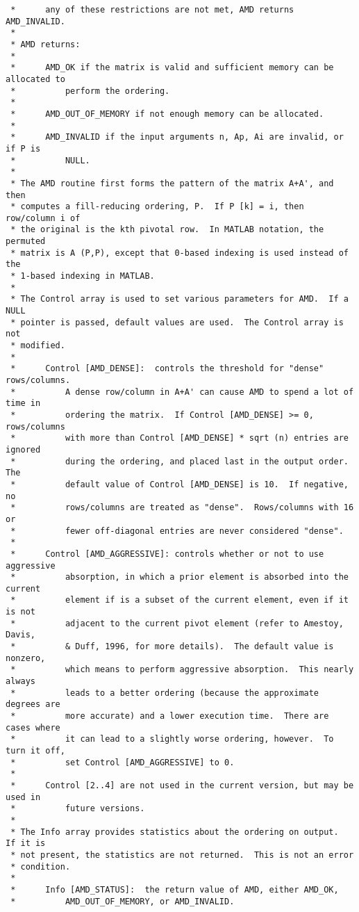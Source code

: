 \documentclass[11pt]{article}
\begin{document}
{\begin{verbatim}
 *      any of these restrictions are not met, AMD returns AMD_INVALID.
 *
 * AMD returns:
 *
 *      AMD_OK if the matrix is valid and sufficient memory can be allocated to
 *          perform the ordering.
 *
 *      AMD_OUT_OF_MEMORY if not enough memory can be allocated.
 *
 *      AMD_INVALID if the input arguments n, Ap, Ai are invalid, or if P is
 *          NULL.
 *
 * The AMD routine first forms the pattern of the matrix A+A', and then
 * computes a fill-reducing ordering, P.  If P [k] = i, then row/column i of
 * the original is the kth pivotal row.  In MATLAB notation, the permuted
 * matrix is A (P,P), except that 0-based indexing is used instead of the
 * 1-based indexing in MATLAB.
 *
 * The Control array is used to set various parameters for AMD.  If a NULL
 * pointer is passed, default values are used.  The Control array is not
 * modified.
 *
 *      Control [AMD_DENSE]:  controls the threshold for "dense" rows/columns.
 *          A dense row/column in A+A' can cause AMD to spend a lot of time in
 *          ordering the matrix.  If Control [AMD_DENSE] >= 0, rows/columns
 *          with more than Control [AMD_DENSE] * sqrt (n) entries are ignored
 *          during the ordering, and placed last in the output order.  The
 *          default value of Control [AMD_DENSE] is 10.  If negative, no
 *          rows/columns are treated as "dense".  Rows/columns with 16 or
 *          fewer off-diagonal entries are never considered "dense".
 *
 *      Control [AMD_AGGRESSIVE]: controls whether or not to use aggressive
 *          absorption, in which a prior element is absorbed into the current
 *          element if is a subset of the current element, even if it is not
 *          adjacent to the current pivot element (refer to Amestoy, Davis,
 *          & Duff, 1996, for more details).  The default value is nonzero,
 *          which means to perform aggressive absorption.  This nearly always
 *          leads to a better ordering (because the approximate degrees are
 *          more accurate) and a lower execution time.  There are cases where
 *          it can lead to a slightly worse ordering, however.  To turn it off,
 *          set Control [AMD_AGGRESSIVE] to 0.
 *
 *      Control [2..4] are not used in the current version, but may be used in
 *          future versions.
 *
 * The Info array provides statistics about the ordering on output.  If it is
 * not present, the statistics are not returned.  This is not an error
 * condition.
 * 
 *      Info [AMD_STATUS]:  the return value of AMD, either AMD_OK,
 *          AMD_OUT_OF_MEMORY, or AMD_INVALID.

\end{verbatim}}
\end{document}
